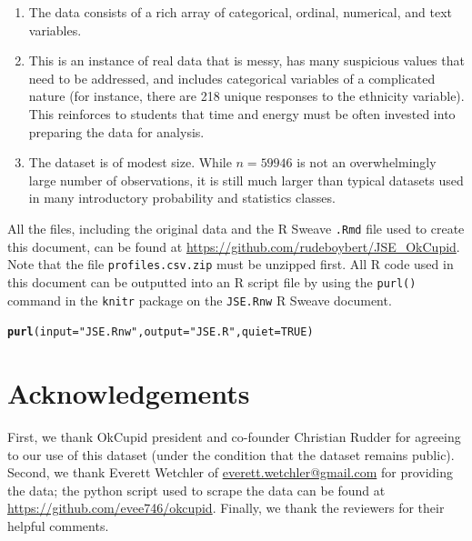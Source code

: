 \documentclass{article}\usepackage[]{graphicx}\usepackage[]{color}
\makeatletter
\newcommand{\hlnum}[1]{\textcolor[rgb]{0.686,0.059,0.569}{#1}}%
\newcommand{\hlstr}[1]{\textcolor[rgb]{0.192,0.494,0.8}{#1}}%
\newcommand{\hlstd}[1]{\textcolor[rgb]{0.345,0.345,0.345}{#1}}%
\newcommand{\hlkwc}[1]{\textcolor[rgb]{0.333,0.667,0.333}{#1}}%
\newcommand{\hlkwd}[1]{\textcolor[rgb]{0.737,0.353,0.396}{\textbf{#1}}}%
\newenvironment{kframe}{%
 \def\at@end@of@kframe{}%
 \ifinner\ifhmode%
  \def\at@end@of@kframe{\end{minipage}}%
  \begin{minipage}{\columnwidth}%
 \fi\fi%
 \def\FrameCommand##1{\hskip\@totalleftmargin \hskip-\fboxsep
 \colorbox{shadecolor}{##1}\hskip-\fboxsep
     \hskip-\linewidth \hskip-\@totalleftmargin \hskip\columnwidth}%
 \MakeFramed {\advance\hsize-\width
   \@totalleftmargin\z@ \linewidth\hsize
   \@setminipage}}%
 {\par\unskip\endMakeFramed%
 \at@end@of@kframe}
\newenvironment{knitrout}{}{} %
\makeatother
\begin{document}
\begin{enumerate}
\item The data consists of a rich array of categorical, ordinal, numerical, and text variables.
\item This is an instance of real data that is messy, has many suspicious values that need to be addressed, and includes categorical variables of a complicated nature (for instance, there are 218 unique responses to the ethnicity variable).  This reinforces to students that time and energy must be often invested into preparing the data for analysis.
\item The dataset is of modest size.  While $n = 59946$ is not an overwhelmingly large number of observations, it is still much larger than typical datasets used in many introductory probability and statistics classes.
\end{enumerate}

All the files, including the original data and the R Sweave \verb#.Rmd# file used to create this document, can be found at \url{https://github.com/rudeboybert/JSE_OkCupid}.  Note that the file \verb#profiles.csv.zip# must be unzipped first.  All R code used in this document can be outputted into an R script file by using the \verb#purl()# command in the \verb#knitr# package on the \verb#JSE.Rnw# R Sweave document.
\begin{knitrout}
\color{fgcolor}\begin{kframe}
\begin{alltt}
\hlkwd{purl}\hlstd{(}\hlkwc{input}\hlstd{=}\hlstr{"JSE.Rnw"}\hlstd{,} \hlkwc{output}\hlstd{=}\hlstr{"JSE.R"}\hlstd{,} \hlkwc{quiet}\hlstd{=}\hlnum{TRUE}\hlstd{)}
\end{alltt}
\end{kframe}
\end{knitrout}










%
\section{Acknowledgements}\label{ack}
%
First, we thank OkCupid president and co-founder Christian Rudder for agreeing to our use of this dataset (under the condition that the dataset remains public).  Second, we thank Everett Wetchler of \url{everett.wetchler@gmail.com} for providing the data; the python script used to scrape the data can be found at \url{https://github.com/evee746/okcupid}.  Finally, we thank the reviewers for their helpful comments.
\end{document}
